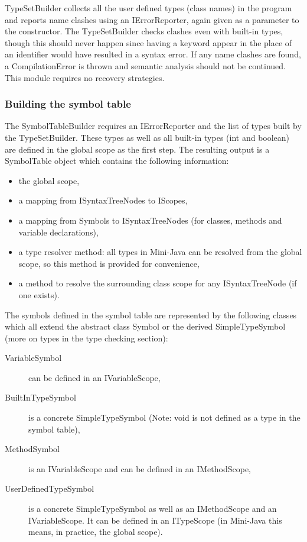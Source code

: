 \documentclass[a4paper,11pt]{article}
\begin{document}
TypeSetBuilder collects all the user defined types (class names) in the program and reports name clashes using an IErrorReporter, again given as a parameter to the constructor. The TypeSetBuilder checks clashes even with built-in types, though this should never happen since having a keyword appear in the place of an identifier would have resulted in a syntax error. If any name clashes are found, a CompilationError is thrown and semantic analysis should not be continued. This module requires no recovery strategies.

\subsubsection{Building the symbol table}

The SymbolTableBuilder requires an IErrorReporter and the list of types built by the TypeSetBuilder. These types as well as all built-in types (int and boolean) are defined in the global scope as the first step. The resulting output is a SymbolTable object which contains the following information:

\begin{itemize}
\item the global scope,
\item a mapping from ISyntaxTreeNodes to IScopes,
\item a mapping from Symbols to ISyntaxTreeNodes (for classes, methods and variable declarations),
\item a type resolver method: all types in Mini-Java can be resolved from the global scope, so this method is provided for convenience,
\item a method to resolve the surrounding class scope for any ISyntaxTreeNode (if one exists).
\end{itemize}

The symbols defined in the symbol table are represented by the following classes which all extend the abstract class Symbol or the derived SimpleTypeSymbol (more on types in the type checking section):

\begin{description}
\item[VariableSymbol] can be defined in an IVariableScope,
\item[BuiltInTypeSymbol] is a concrete SimpleTypeSymbol (Note: void is not defined as a type in the symbol table),
\item[MethodSymbol] is an IVariableScope and can be defined in an IMethodScope,
\item[UserDefinedTypeSymbol] is a concrete SimpleTypeSymbol as well as an IMethodScope and an IVariableScope. It can be defined in an ITypeScope (in Mini-Java this means, in practice, the global scope).
\end{description}
\end{document}
